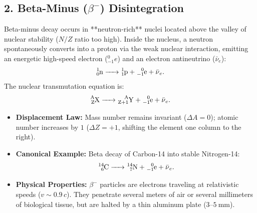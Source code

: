 \subsection{2. Beta-Minus ($\beta^-$) Disintegration}
Beta-minus decay occurs in **neutron-rich** nuclei located above the valley of nuclear stability ($N/Z$ ratio too high). Inside the nucleus, a neutron spontaneously converts into a proton via the weak nuclear interaction, emitting an energetic high-speed electron ($^0_{-1}e$) and an electron antineutrino ($\bar{\nu}_e$):
\begin{equation}
\ce{^1_0n -> ^1_1p + ^0_{-1}e + \bar{\nu}_e}.
\end{equation}
The nuclear transmutation equation is:
\begin{equation}
\ce{^{A}_{Z}X -> ^{A}_{Z+1}Y + ^0_{-1}e + \bar{\nu}_e}.
\end{equation}
\begin{itemize}[leftmargin=1.5em,itemsep=2pt]
  \item \textbf{Displacement Law:} Mass number remains invariant ($\Delta A = 0$); atomic number increases by $1$ ($\Delta Z = +1$, shifting the element one column to the right).
  \item \textbf{Canonical Example:} Beta decay of Carbon-14 into stable Nitrogen-14:
  \[
  \ce{^{14}_6C -> ^{14}_7N + ^0_{-1}e + \bar{\nu}_e}.
  \]
  \item \textbf{Physical Properties:} $\beta^-$ particles are electrons traveling at relativistic speeds ($v \sim 0.9\,c$). They penetrate several meters of air or several millimeters of biological tissue, but are halted by a thin aluminum plate ($3\text{--}5\ \mathrm{mm}$).
\end{itemize}

